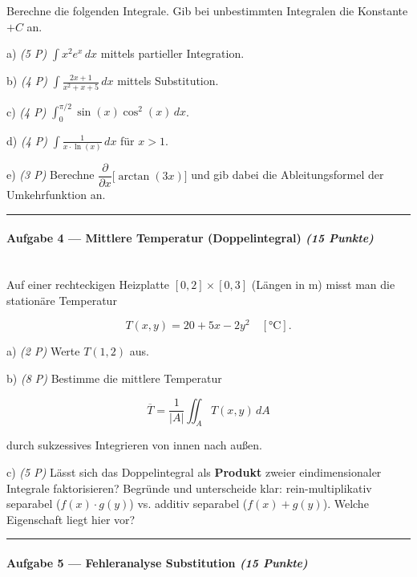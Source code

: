 \documentclass[11pt, a4paper]{article}
\begin{document}
Berechne die folgenden Integrale. Gib bei unbestimmten Integralen die Konstante $+C$ an.


a) \textit{(5 P)} $\displaystyle \int x^2 e^x\, dx$ mittels partieller Integration.


b) \textit{(4 P)} $\displaystyle \int \frac{2x+1}{x^2+x+5}\, dx$ mittels Substitution.


c) \textit{(4 P)} $\displaystyle \int_0^{\pi/2} \sin(x)\cos^2(x)\, dx$.


d) \textit{(4 P)} $\displaystyle \int \frac{1}{x \cdot \ln(x)}\, dx$ für $x>1$.


e) \textit{(3 P)} Berechne $\dfrac{\partial}{\partial x}\big[\arctan(3x)\big]$ und gib dabei die Ableitungsformel der Umkehrfunktion an.



\noindent\textcolor{rulegray}{\rule{\linewidth}{0.4pt}}


\paragraph{Aufgabe 4 — Mittlere Temperatur (Doppelintegral) \textit{(15 Punkte)}}\mbox{}\\[2pt]

Auf einer rechteckigen Heizplatte $[0,2] \times [0,3]$ (Längen in m) misst man die stationäre Temperatur

\[
T(x,y) = 20 + 5x - 2y^2 \quad [\text{°C}].
\]


a) \textit{(2 P)} Werte $T(1,2)$ aus.


b) \textit{(8 P)} Bestimme die mittlere Temperatur

\[
\overline{T} = \frac{1}{|A|} \iint_A T(x,y)\, dA
\]

durch sukzessives Integrieren von innen nach außen.


c) \textit{(5 P)} Lässt sich das Doppelintegral als \textbf{Produkt} zweier eindimensionaler Integrale faktorisieren? Begründe und unterscheide klar: rein-multiplikativ separabel ($f(x)\cdot g(y)$) vs. additiv separabel ($f(x)+g(y)$). Welche Eigenschaft liegt hier vor?



\noindent\textcolor{rulegray}{\rule{\linewidth}{0.4pt}}


\paragraph{Aufgabe 5 — Fehleranalyse Substitution \textit{(15 Punkte)}}\mbox{}\\[2pt]
\end{document}
